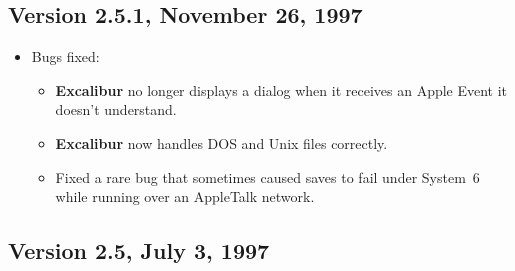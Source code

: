 ﻿\documentclass[11pt,titlepage]{article}
\newcommand{\ex}{\textbf{Excalibur}}
\begin{document}
\subsection{Version 2.5.1, November 26, 1997}

\begin{itemize}

\item Bugs fixed:

  \begin{itemize}

  \item \ex{} no longer displays a dialog when it receives an Apple
    Event it doesn't understand.

  \item \ex{} now handles DOS and Unix files correctly.

  \item Fixed a rare bug that sometimes caused saves to fail under
    System~6 while running over an AppleTalk network.

  \end{itemize}

\end{itemize}

\subsection{Version 2.5, July 3, 1997}
\end{document}
